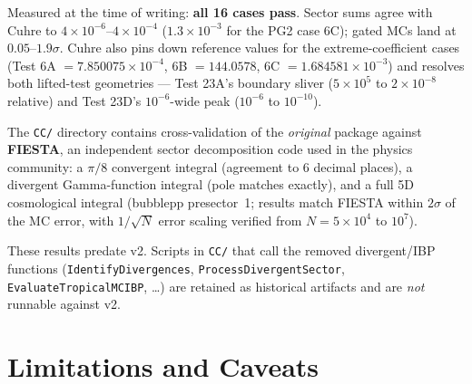 \documentclass[11pt,a4paper]{article}
\begin{document}
Measured at the time of writing: \textbf{all 16 cases pass}. Sector sums agree with Cuhre to $4{\times}10^{-6}$--$4{\times}10^{-4}$ ($1.3{\times}10^{-3}$ for the PG2 case 6C); gated MCs land at $0.05$--$1.9\sigma$. Cuhre also pins down reference values for the extreme-coefficient cases (Test 6A $= 7.850075{\times}10^{-4}$, 6B $= 144.0578$, 6C $= 1.684581{\times}10^{-3}$) and resolves both lifted-test geometries --- Test 23A's boundary sliver ($5{\times}10^5$ to $2{\times}10^{-8}$ relative) and Test 23D's $10^{-6}$-wide peak ($10^{-6}$ to $10^{-10}$).

The \texttt{CC/} directory contains cross-validation of the \emph{original} package against \textbf{FIESTA}, an independent sector decomposition code used in the physics community: a $\pi/8$ convergent integral (agreement to 6 decimal places), a divergent Gamma-function integral (pole matches exactly), and a full 5D cosmological integral (bubblepp presector~1; results match FIESTA within $2\sigma$ of the MC error, with $1/\sqrt{N}$ error scaling verified from $N = 5\times10^4$ to $10^7$).

These results predate v2. Scripts in \texttt{CC/} that call the removed divergent/IBP functions (\texttt{IdentifyDivergences}, \texttt{ProcessDivergentSector}, \texttt{EvaluateTropicalMCIBP}, \ldots) are retained as historical artifacts and are \emph{not} runnable against v2.

\section{Limitations and Caveats}
\end{document}
